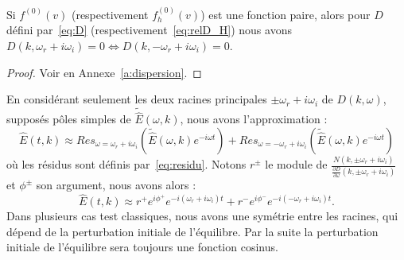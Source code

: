 \begin{lemma}
  Si $f^{(0)}(v)$ (respectivement $f_h^{(0)}(v)$) est une fonction paire, alors pour $D$ défini par~\eqref{eq:D} (respectivement~\eqref{eq:relD_H}) nous avons $D(k,\omega_r+i\omega_i) = 0 \Leftrightarrow D(k,-\omega_r+i\omega_i)=0$.
  \label{lemma:doubleracine}
\end{lemma}
\begin{proof}
  Voir en Annexe~\ref{a:dispersion}.  
\end{proof}

En considérant seulement les deux racines principales $\pm\omega_r + i\omega_i$ de $D(k,\omega)$, supposés pôles simples de $\tilde{\hat{E}}(\omega,k)$, nous avons l'approximation :
$$
  \hat{E}(t,k)\approx Res_{\omega=\omega_r+i\omega_i}\left(\tilde{\hat{E}}(\omega,k)e^{-i\omega t}\right)+Res_{\omega=-\omega_r+i\omega_i}\left(\tilde{\hat{E}}(\omega,k)e^{-i\omega t}\right)
$$
où les résidus sont définis par~\eqref{eq:residu}. Notons $r^\pm$ le module de $\frac{N(k,\pm\omega_r+i\omega_i)}{\frac{\partial D}{\partial \omega}(k,\pm\omega_r+i\omega_i)}$ et $\phi^\pm$ son argument, nous avons alors :
\begin{equation}
  \hat{E}(t,k)\approx r^+e^{i\phi^+}e^{-i(\omega_r+i\omega_i)t}+r^-e^{i\phi^-}e^{-i(-\omega_r+i\omega_i)t}. 
  \label{eq:Etk_sanssym}
\end{equation}
Dans plusieurs cas test classiques, nous avons une symétrie entre les racines, qui dépend de la perturbation initiale de l'équilibre. Par la suite la perturbation initiale de l'équilibre sera toujours une fonction cosinus.

